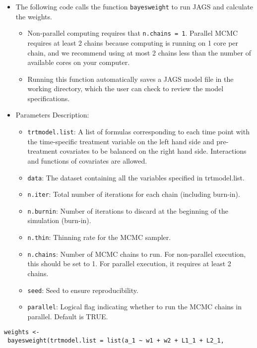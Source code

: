 \begin{itemize}
\tightlist
\item
  The following code calls the function \texttt{bayesweight} to run JAGS and
  calculate the weights.

  \begin{itemize}
  \tightlist
  \item
    Non-parallel computing requires that \texttt{n.chains\ =\ 1}. Parallel
    MCMC requires at least 2 chains because computing is running on
    1 core per chain, and we recommend using at most 2 chains less
    than the number of available cores on your computer.
  \item
    Running this function automatically saves a JAGS model file in
    the working directory, which the user can check to review the
    model specifications.
  \end{itemize}
\item
  Parameters Description:

  \begin{itemize}
  \tightlist
  \item
    \texttt{trtmodel.list}: A list of formulas corresponding to each time
    point with the time-specific treatment variable on the left hand
    side and pre-treatment covariates to be balanced on the right
    hand side. Interactions and functions of covariates are allowed.
  \item
    \texttt{data}: The dataset containing all the variables specified in
    trtmodel.list.
  \item
    \texttt{n.iter}: Total number of iterations for each chain (including
    burn-in).
  \item
    \texttt{n.burnin}: Number of iterations to discard at the beginning of
    the simulation (burn-in).
  \item
    \texttt{n.thin}: Thinning rate for the MCMC sampler.
  \item
    \texttt{n.chains}: Number of MCMC chains to run. For non-parallel
    execution, this should be set to 1. For parallel execution, it
    requires at least 2 chains.
  \item
    \texttt{seed}: Seed to ensure reproducibility.
  \item
    \texttt{parallel}: Logical flag indicating whether to run the MCMC
    chains in parallel. Default is TRUE.
  \end{itemize}
\end{itemize}

\texttt{weights\ \textless{}-\ bayesweight(trtmodel.list\ =\ list(a\_1\ \textasciitilde{}\ w1\ +\ w2\ +\ L1\_1\ +\ L2\_1,}

